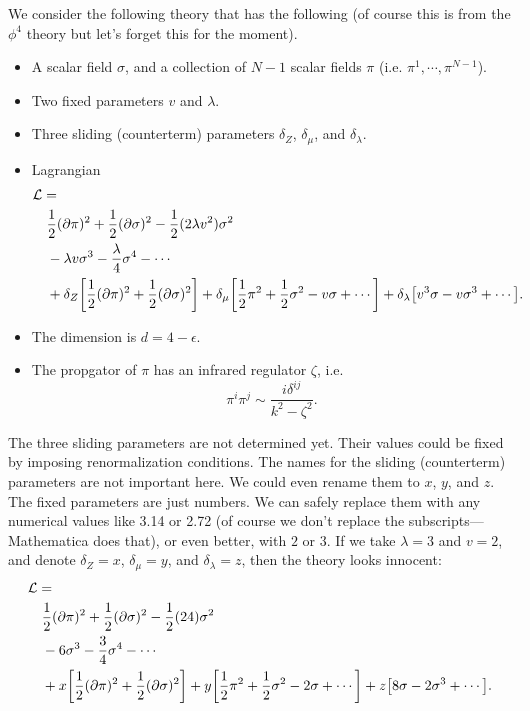 \documentclass{article}
\begin{document}
We consider the following theory that has the following (of course this is from the $\phi^4$ theory but let's forget this for the moment).
\begin{itemize}
    \item A scalar field $\sigma$, and a collection of $N-1$ scalar fields $\pi$ (i.e. $\pi^1,\cdots,\pi^{N-1}$).
    \item Two fixed parameters $v$ and $\lambda$.
    \item Three sliding (counterterm) parameters $\delta_Z$, $\delta_\mu$, and $\delta_\lambda$.
    \item Lagrangian
    \begin{align*}
        & \mathcal{L} = \\
        & \quad \frac{1}{2}(\partial \pi)^2 + \frac{1}{2} (\partial \sigma)^2 - \frac{1}{2} (2\lambda v^2) \sigma^2 \\
        & \quad - \lambda v \sigma^3 - \frac{\lambda}{4}\sigma^4 - \cdots \\
        & \quad + \delta_Z\qty[\frac{1}{2}(\partial\pi)^2 + \frac{1}{2}(\partial \sigma)^2] + \delta_\mu\qty[\frac{1}{2} \pi^2 + \frac{1}{2}\sigma^2 - v \sigma + \cdots] + \delta_\lambda\qty[v^3 \sigma - v \sigma^3 + \cdots].
    \end{align*}
    \item The dimension is $d = 4-\epsilon$.
    \item The propgator of $\pi$ has an infrared regulator $\zeta$, i.e.
    \[ \pi^i\pi^j \sim \frac{i \delta^{ij}}{k^2 - \zeta^2}. \]
\end{itemize}

The three sliding parameters are not determined yet.
Their values could be fixed by imposing renormalization conditions.
The names for the sliding (counterterm) parameters are not important here.
We could even rename them to $x$, $y$, and $z$.
The fixed parameters are just numbers.
We can safely replace them with any numerical values like \num{3.14} or \num{2.72} (of course we don't replace the subscripts---Mathematica does that), or even better, with $2$ or $3$.
If we take $\lambda = 3$ and $v=2$, and denote $\delta_Z = x$, $\delta_\mu = y$, and $\delta_\lambda = z$, then the theory looks innocent:
\begin{align*}
    & \mathcal{L} = \\
    & \quad \frac{1}{2}(\partial \pi)^2 + \frac{1}{2} (\partial \sigma)^2 - \frac{1}{2} (24) \sigma^2 \\
    & \quad - 6 \sigma^3 - \frac{3}{4}\sigma^4 - \cdots \\
    & \quad + x \qty[\frac{1}{2}(\partial\pi)^2 + \frac{1}{2}(\partial \sigma)^2] + y \qty[\frac{1}{2} \pi^2 + \frac{1}{2}\sigma^2 - 2 \sigma + \cdots] + z \qty[8 \sigma - 2 \sigma^3 + \cdots].
\end{align*}
\end{document}
